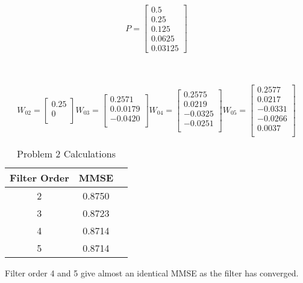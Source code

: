 \documentclass[12pt]{article}
\newenvironment{problem}[2][Problem]{\begin{trivlist}
\item[\hskip \labelsep {\bfseries #1}\hskip \labelsep {\bfseries #2.}]}{\end{trivlist}}
\begin{document}
\begin{problem}{2}
\text{ }
\[
P=
  \begin{bmatrix}
    0.5 \\
    0.25 \\
    0.125\\
    0.0625\\
    0.03125
  \end{bmatrix}
\]\\
\end{problem}
\\
\[
W_02=
    \begin{bmatrix}
    0.25\\
    0\\
    \end{bmatrix}%
%
W_03=
    \begin{bmatrix}
    0.2571\\
    0.0.0179\\
    -0.0420\\
    \end{bmatrix}
W_04=
    \begin{bmatrix}
    0.2575\\
    0.0219\\
    -0.0325\\
    -0.0251\\
    \end{bmatrix}
W_05=
    \begin{bmatrix}
    0.2577\\
    0.0217\\
    -0.0331\\
    -0.0266\\
    0.0037\\
    \end{bmatrix}
\]
\begin{table}[H]
\centering
 \begin{tabular}{ | c | c | c |}
    \hline
    Filter Order & MMSE \\
    \hline\hline
    2        & 0.8750 \\
    \hline
    3        & 0.8723 \\
    \hline
    4        & 0.8714 \\
    \hline
    5        & 0.8714 \\
    \hline
  \end{tabular}
  \caption{Problem 2 Calculations}
  \label{table:calcs}
\end{table}
Filter order 4 and 5 give almost an identical MMSE as the filter has converged.\\
\end{document}
